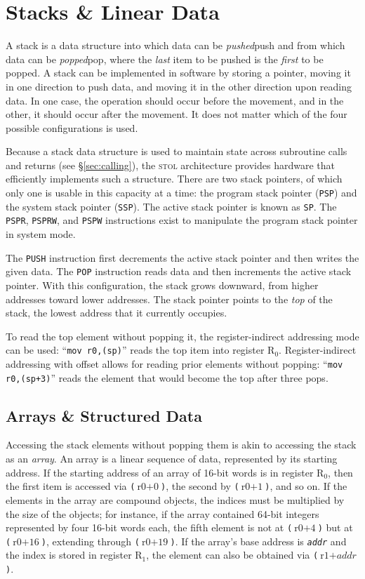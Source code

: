 \documentclass[12pt,english]{book}
\newcommand*{\concept}[2][]{%
  \textit{#2}\ifx#1\empty\empty\index{#2}\else\index{#1}\fi}
\begin{document}

\chapter{Stacks \& Linear Data}\label{ch:data}
A stack is a data structure
into which data can be \concept[push]{pushed}
and from which data can be \concept[pop]{popped},
where the \emph{last} item to be pushed
is the \emph{first} to be popped.
A stack can be implemented in software by storing a pointer,
moving it in one direction to push data,
and moving it in the other direction upon reading data.
In one case, the operation should occur before the movement,
and in the other, it should occur after the movement.
It does not matter which of the four possible configurations is used.

Because a stack data structure is used to maintain state
across subroutine calls and returns (see \S\ref{sec:calling}),
the \textsc{stol} architecture provides hardware
that efficiently implements such a structure.
There are two stack pointers,
of which only one is usable in this capacity at a time:
the program stack pointer (\texttt{PSP})
and the system stack pointer (\texttt{SSP}).
The active stack pointer is known as \texttt{SP}.
The \texttt{PSPR}, \texttt{PSPRW}, and \texttt{PSPW} instructions
exist to manipulate the program stack pointer
in system mode.

The \texttt{PUSH} instruction
first decrements the active stack pointer
and then writes the given data.
The \texttt{POP} instruction
reads data and then increments the active stack pointer.
With this configuration, the stack grows downward,
from higher addresses toward lower addresses.
The stack pointer points to the \emph{top} of the stack,
the lowest address that it currently occupies.

To read the top element without popping it,
the register-indirect addressing mode can be used:
``\texttt{mov r0,(sp)}''
reads the top item into register \(\text{R}_0\).
Register-indirect addressing with offset
allows for reading prior elements
without popping:
``\texttt{mov r0,(sp+3)}''
reads the element that would become the top
after three pops.

\section{Arrays \& Structured Data}
Accessing the stack elements without popping them
is akin to accessing the stack as an \emph{array}.
An array is a linear sequence of data,
represented by its starting address.
If the starting address of an array of 16-bit words
is in register \(\text{R}_0\),
then the first item is accessed via \texttt{(\(\text{r0}+\text{0}\))},
the second by \texttt{(\(\text{r0}+\text{1}\))}, and so on.
If the elements in the array are compound objects,
the indices must be multiplied by the size of the objects;
for instance, if the array contained 64-bit integers represented
by four 16-bit words each,
the fifth element is not at \texttt{(\(\text{r0}+\text{4}\))}
but at \texttt{(\(\text{r0}+\text{16}\))},
extending through \texttt{(\(\text{r0}+\text{19}\))}.
If the array's base address is \texttt{\textit{addr}}
and the index is stored in register \(\text{R}_1\),
the element can also be obtained via
\texttt{(\(\text{r1}+\textit{addr}\))}.
\end{document}
